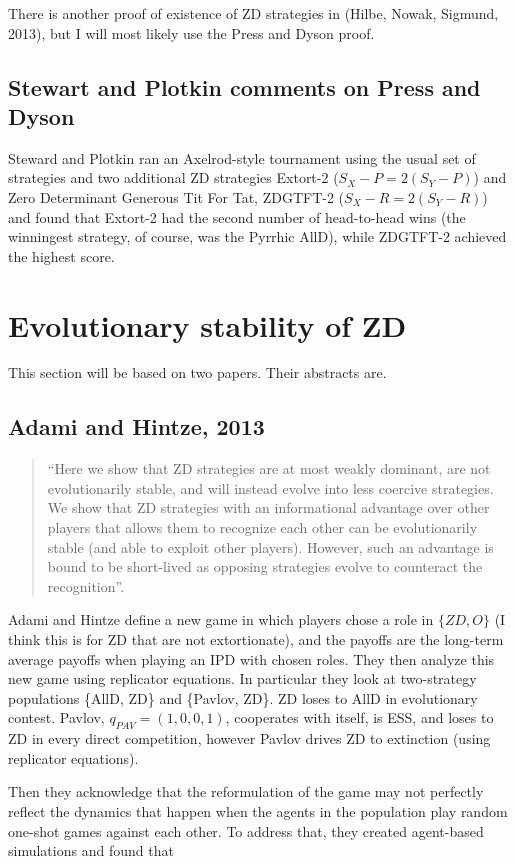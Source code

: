 There is another proof of existence of ZD strategies in (Hilbe, Nowak, Sigmund, 2013), but I will most likely use the Press and Dyson proof.

\subsection{Stewart and Plotkin comments on Press and Dyson}
Steward and Plotkin ran an Axelrod-style tournament using the usual set of strategies and two additional ZD strategies Extort-2 ($S_X - P = 2(S_Y - P)$) and Zero Determinant Generous Tit For Tat, ZDGTFT-2 ($S_X - R = 2(S_Y - R)$) and found that Extort-2 had the second number of head-to-head wins (the winningest strategy, of course, was the Pyrrhic AllD), while ZDGTFT-2 achieved the highest score.


\section{Evolutionary stability of ZD}
This section will be based on two papers. Their abstracts are.
\subsection{Adami and Hintze, 2013}
\begin{quote}``Here we show that ZD strategies are at most weakly dominant, are not evolutionarily stable, and will instead evolve into less coercive strategies. We show that ZD strategies with an informational advantage over other players that allows them to recognize each other can be evolutionarily stable (and able to exploit other players). However, such an advantage is bound to be short-lived as opposing strategies evolve to counteract the recognition''.
\end{quote}

Adami and Hintze define a new game in which players chose a role in $\{ZD, O\}$ (I think this is for ZD that are not extortionate), and the payoffs are the long-term average payoffs when playing an IPD with chosen roles. They then analyze this new game using replicator equations. In particular they look at two-strategy populations \{AllD, ZD\} and \{Pavlov, ZD\}. ZD loses to AllD in evolutionary contest. Pavlov, $q_{PAV} = (1, 0, 0, 1)$, cooperates with itself, is ESS, and loses to ZD in every direct competition, however Pavlov drives ZD to extinction (using replicator equations).

Then they acknowledge that the reformulation of the game may not perfectly reflect the dynamics that happen when the agents in the population play random one-shot games against each other. To address that, they created agent-based simulations and found that 


